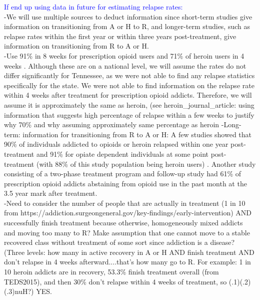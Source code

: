 \documentclass[12pt]{article}
\begin{document}
\textcolor{blue}{If end up using data in future for estimating relapse rates:} \\
-We will use multiple sources to deduct information since short-term studies give information on transitioning from A or H to R, and longer-term studies, such as relapse rates within the first year or within three years post-treatment, give information on transitioning from R to A or H. \\
 -Use 91\% in 8 weeks for prescription opioid users and 71\% of heroin users in 4 weeks \cite{Weiss, Smyth}. Although these are on a national level, we will assume the rates do not differ significantly for Tennessee, as we were not able to find any relapse statistics specifically for the state. We were not able to find information on the relapse rate within 4 weeks after treatment for prescription opioid addicts. Therefore, we will assume it is approximately the same as heroin, (see heroin\_journal\_article: using information that suggests high percentage of relapse within a few weeks to justify why 70\% and why assuming approximately same percentage as heroin
-Long-term: information for transitioning from R to A or H:
A few studies showed that 90\% of individuals addicted to opioids or heroin relapsed within one year post-treatment and 91\% for opiate dependent individuals at some point post-treatment (with 88\% of this study population being heroin users) \cite{Bailey, Smyth}. Another study consisting of a two-phase treatment program and follow-up study had 61\% of prescription opioid addicts abstaining from opioid use in the past month at the 3.5 year mark after treatment. \\
-Need to consider the number of people that are actually in treatment (1 in 10 from https://addiction.surgeongeneral.gov/key-findings/early-intervention) AND successfully finish treatment because otherwise, homogeneously mixed addicts and moving too many to R? Make assumption that one cannot move to a stable recovered class without treatment of some sort since addiction is a disease? (Three levels: how many in active recovery in A or H AND finish treatment AND don't relapse in 4 weeks afterward....that's how many go to R. For example: 1 in 10 heroin addicts are in recovery, 53.3\% finish treatment overall (from TEDS2015), and then 30\% don't relapse within 4 weeks of treatment, so (.1)(.2)(.3)nuH?) YES.
\end{document}

